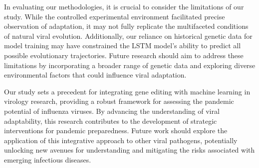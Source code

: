\documentclass{article}
\begin{document}
In evaluating our methodologies, it is crucial to consider the limitations of our study. While the controlled experimental environment facilitated precise observation of adaptation, it may not fully replicate the multifaceted conditions of natural viral evolution. Additionally, our reliance on historical genetic data for model training may have constrained the LSTM model's ability to predict all possible evolutionary trajectories. Future research should aim to address these limitations by incorporating a broader range of genetic data and exploring diverse environmental factors that could influence viral adaptation.

Our study sets a precedent for integrating gene editing with machine learning in virology research, providing a robust framework for assessing the pandemic potential of influenza viruses. By advancing the understanding of viral adaptability, this research contributes to the development of strategic interventions for pandemic preparedness. Future work should explore the application of this integrative approach to other viral pathogens, potentially unlocking new avenues for understanding and mitigating the risks associated with emerging infectious diseases.
\end{document}
